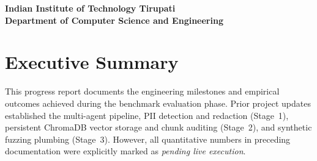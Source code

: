 \documentclass[10pt,a4paper]{article}
\begin{document}
\begin{titlepage}
    \vfill

    \begin{center}
        \textbf{Indian Institute of Technology Tirupati}\\
        \textbf{Department of Computer Science and Engineering}
    \end{center}
    
    \vspace{0.5cm}
\end{titlepage}

\section{Executive Summary}

This progress report documents the engineering milestones and empirical outcomes achieved during the benchmark evaluation phase. Prior project updates established the multi-agent pipeline, PII detection and redaction (Stage~1), persistent ChromaDB vector storage and chunk auditing (Stage~2), and synthetic fuzzing plumbing (Stage~3). However, all quantitative numbers in preceding documentation were explicitly marked as \textit{pending live execution}.
\end{document}
